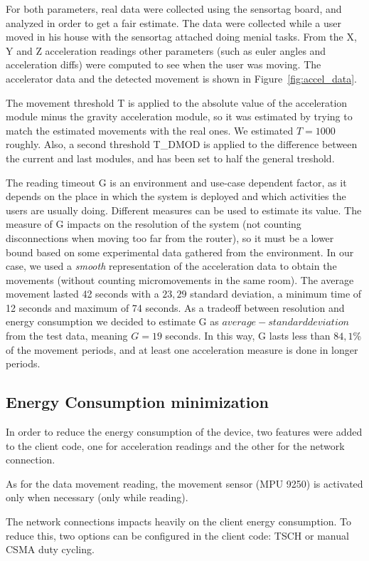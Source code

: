 \documentclass[a4paper, 10pt]{article}
\begin{document}
For both parameters, real data were collected using the sensortag board, and analyzed in order to get a fair estimate.
The data were collected while a user moved in his house with the sensortag attached doing menial tasks.
From the X, Y and Z acceleration readings other parameters (such as euler angles and acceleration diffs) were computed to see when the user was moving.
The accelerator data and the detected movement is shown in Figure~\ref{fig:accel_data}.

The movement threshold T is applied to the absolute value of the acceleration module minus the gravity acceleration module, so it was estimated by trying to match the estimated movements with the real ones. We estimated $T = 1000$ roughly. Also, a second threshold T\_DMOD is applied to the difference between the current and last modules, and has been set to half the general treshold. 

The reading timeout G is an environment and use-case dependent factor, as it depends on the place in which the system is deployed and which activities the users are usually doing.
Different measures can be used to estimate its value.
The measure of G impacts on the resolution of the system (not counting disconnections when moving too far from the router), so it must be a lower bound based on some experimental data gathered from the environment.
In our case, we used a \emph{smooth} representation of the acceleration data to obtain the movements (without counting micromovements in the same room).
The average movement lasted 42 seconds with a $23,29$ standard deviation, a minimum time of 12 seconds and maximum of 74 seconds.
As a tradeoff between resolution and energy consumption we decided to estimate G as $average - standard deviation$ from the test data, meaning $G = 19$ seconds.
In this way, G lasts less than $84,1$\% of the movement periods, and at least one acceleration measure is done in longer periods.

\subsection*{Energy Consumption minimization}
In order to reduce the energy consumption of the device, two features were added to the client code, one for acceleration readings and the other for the network connection.

As for the data movement reading, the movement sensor (MPU 9250) is activated only when necessary (only while reading). 

The network connections impacts heavily on the client energy consumption. To reduce this, two options can be configured in the client code: TSCH or manual CSMA duty cycling.
\end{document}
